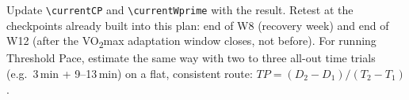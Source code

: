 \documentclass[a4paper,10pt]{article}
\newcommand{\NoteBox}[1]{%
  \noindent\colorbox{accent!6}{\begin{minipage}{\dimexpr\textwidth-2\fboxsep\relax}
  \footnotesize #1
  \end{minipage}}%
}
\begin{document}
\medskip

\NoteBox{Update \texttt{\textbackslash currentCP} and \texttt{\textbackslash currentWprime}
with the result. Retest at the checkpoints already built into this plan: end of W8 (recovery week) and end
of W12 (after the VO\textsubscript{2}max adaptation window closes, not before). For running Threshold Pace,
estimate the same way with two to three all-out time trials (e.g.\ 3\,min + 9--13\,min) on a flat, consistent
route: $TP = (D_2 - D_1)/(T_2 - T_1)$.}
\end{document}
